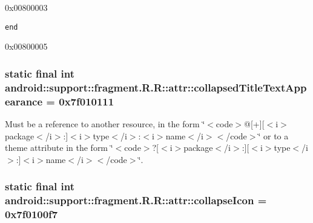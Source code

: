 0x00800003

{\tt end}

0x00800005\hypertarget{classandroid_1_1support_1_1fragment_1_1_r_1_1attr_bc35e716d881f287888dfb0903e89842}{
\subsubsection[{collapsedTitleTextAppearance}]{\setlength{\rightskip}{0pt plus 5cm}static final int android::support::fragment.R.R::attr::collapsedTitleTextAppearance = 0x7f010111}}
\label{classandroid_1_1support_1_1fragment_1_1_r_1_1attr_bc35e716d881f287888dfb0903e89842}


Must be a reference to another resource, in the form \char`\"{}$<$code$>$@\mbox{[}+\mbox{]}\mbox{[}$<$i$>$package$<$/i$>$:\mbox{]}$<$i$>$type$<$/i$>$:$<$i$>$name$<$/i$>$$<$/code$>$\char`\"{} or to a theme attribute in the form \char`\"{}$<$code$>$?\mbox{[}$<$i$>$package$<$/i$>$:\mbox{]}\mbox{[}$<$i$>$type$<$/i$>$:\mbox{]}$<$i$>$name$<$/i$>$$<$/code$>$\char`\"{}. \hypertarget{classandroid_1_1support_1_1fragment_1_1_r_1_1attr_f1403714adbb1c753377d51b21992d7c}{
\subsubsection[{collapseIcon}]{\setlength{\rightskip}{0pt plus 5cm}static final int android::support::fragment.R.R::attr::collapseIcon = 0x7f0100f7}}
\label{classandroid_1_1support_1_1fragment_1_1_r_1_1attr_f1403714adbb1c753377d51b21992d7c}



